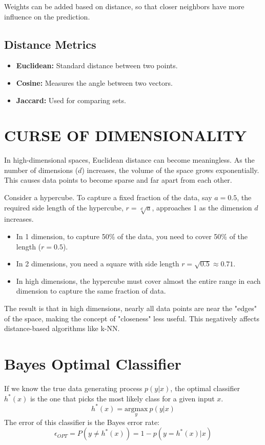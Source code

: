 \documentclass{article}
\begin{document}
\begin{multicols}{2}
Weights can be added based on distance, so that closer neighbors have more influence on the prediction. 

\subsection{Distance Metrics}
\begin{itemize}
    \item \textbf{Euclidean:} Standard distance between two points. 
    \item \textbf{Cosine:} Measures the angle between two vectors. 
    \item \textbf{Jaccard:} Used for comparing sets. 
\end{itemize}

\section{CURSE OF DIMENSIONALITY}
In high-dimensional spaces, Euclidean distance can become meaningless.  As the number of dimensions ($d$) increases, the volume of the space grows exponentially.  This causes data points to become sparse and far apart from each other. 

Consider a hypercube. To capture a fixed fraction of the data, say $a=0.5$, the required side length of the hypercube, $r = \sqrt[d]{a}$, approaches 1 as the dimension $d$ increases. 
\begin{itemize}
    \item In 1 dimension, to capture 50\% of the data, you need to cover 50\% of the length ($r=0.5$). 
    \item In 2 dimensions, you need a square with side length $r = \sqrt{0.5} \approx 0.71$. 
    \item In high dimensions, the hypercube must cover almost the entire range in each dimension to capture the same fraction of data. 
\end{itemize}
The result is that in high dimensions, nearly all data points are near the "edges" of the space, making the concept of "closeness" less useful.  This negatively affects distance-based algorithms like k-NN. 

\section{Bayes Optimal Classifier}
If we know the true data generating process $p(y|x)$, the optimal classifier $h^*(x)$ is the one that picks the most likely class for a given input $x$. 
$$ h^*(x) = \underset{y}{\text{argmax}} \ p(y|x) $$
The error of this classifier is the Bayes error rate:
$$ \epsilon_{OPT} = P(y \neq h^*(x)) = 1 - p(y=h^*(x)|x) $$


\end{multicols}
\end{document}
